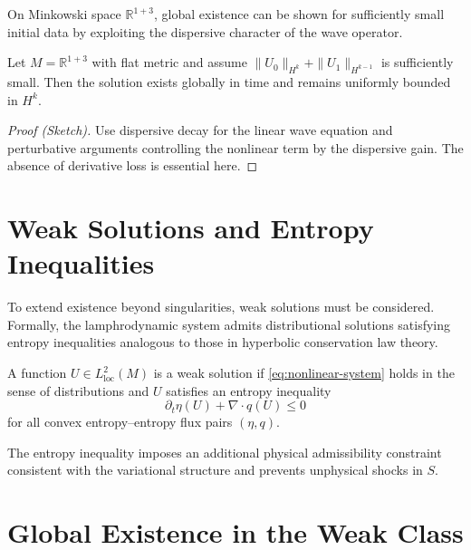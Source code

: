 On Minkowski space $\mathbb{R}^{1+3}$, global existence can be shown
for sufficiently small initial data by exploiting the dispersive
character of the wave operator.

\begin{theorem}
\label{thm:small-data}
Let $M=\mathbb{R}^{1+3}$ with flat metric and assume
$\|U_{0}\|_{H^{k}}+\|U_{1}\|_{H^{k-1}}$ is sufficiently small.
Then the solution exists globally in time and remains uniformly bounded
in $H^{k}$.
\end{theorem}

\begin{proof}[Proof (Sketch)]
Use dispersive decay for the linear wave equation and perturbative
arguments controlling the nonlinear term by the dispersive gain.
The absence of derivative loss is essential here.
\end{proof}



\section{Weak Solutions and Entropy Inequalities}
\label{sec:weak-sol}

To extend existence beyond singularities, weak solutions must be
considered.  Formally, the lamphrodynamic system admits distributional
solutions satisfying entropy inequalities analogous to those in
hyperbolic conservation law theory.

\begin{definition}
A function $U\in L^{2}_{\mathrm{loc}}(M)$ is a weak solution if
\eqref{eq:nonlinear-system} holds in the sense of distributions and
$U$ satisfies an entropy inequality
\[
\partial_{t}\eta(U)
+\nabla\!\cdot\! q(U)
\le 0
\]
for all convex entropy--entropy flux pairs $(\eta,q)$.
\end{definition}

\begin{remark}
The entropy inequality imposes an additional physical admissibility
constraint consistent with the variational structure and prevents
unphysical shocks in $S$.
\end{remark}



\section{Global Existence in the Weak Class}
\label{sec:weak-global}


